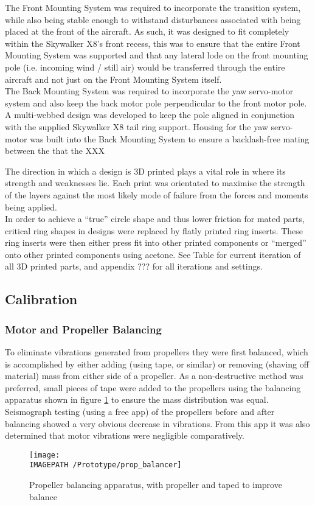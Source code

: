 The Front Mounting System was required to incorporate the transition system, while also being stable enough to withstand disturbances associated with being placed at the front of the aircraft. As such, it was designed to fit completely within the Skywalker X8's front recess, this was to ensure that the entire Front Mounting System was supported and that any lateral lode on the front mounting pole (i.e. incoming wind / still air) would be transferred through the entire aircraft and not just on the Front Mounting System itself.\\

The Back Mounting System was required to incorporate the yaw servo-motor system and also keep the back motor pole perpendicular to the front motor pole. A multi-webbed design was developed to keep the pole aligned in conjunction with the supplied Skywalker X8 tail ring support. Housing for the yaw servo-motor was built into the Back Mounting System to ensure a backlash-free mating between the that the XXX

The direction in which a design is 3D printed plays a vital role in where its strength and weaknesses lie. Each print was orientated to maximise the strength of the layers against the most likely mode of failure from the forces and moments being applied.\\
In order to achieve a ``true'' circle shape and thus lower friction for mated parts, critical ring shapes in designs were replaced by flatly printed ring inserts. These ring inserts were then either press fit into other printed components or ``merged'' onto other printed components using acetone. See Table \red{[REF]} for current iteration of all 3D printed parts, and appendix ??? for all iterations and settings. 

\subsection{Calibration}
\subsubsection*{Motor and Propeller Balancing}
To eliminate vibrations generated from propellers they were first balanced, which is accomplished by either adding (using tape, or similar) or removing (shaving off material) mass from either side of a propeller. As a non-destructive method was preferred, small pieces of tape were added to the propellers using the balancing apparatus shown in figure \ref{fig:propbalancing} to ensure the mass distribution was equal.  Seismograph testing (using a free app) of the propellers before and after balancing showed a very obvious decrease in vibrations. From this app it was also determined that motor vibrations were negligible comparatively.
\begin{figure}[!ht]
	\centering
	\texttt{[image: \\IMAGEPATH /Prototype/prop\_balancer]}
	\caption{Propeller balancing apparatus, with propeller and taped to improve balance}
	\label{fig:propbalancing}
\end{figure}


